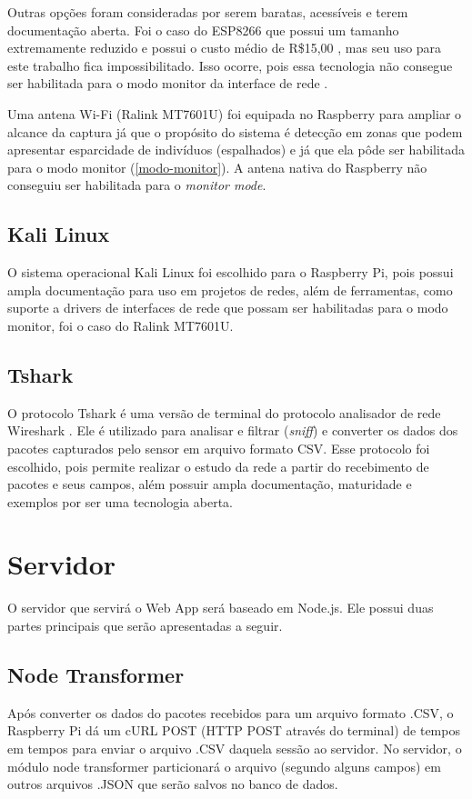 Outras opções foram consideradas por serem baratas, acessíveis e terem documentação aberta. Foi o caso do ESP8266 que possui um tamanho extremamente
reduzido e possui o custo médio de R\$15,00 \cite{Embarcados2015}, mas seu uso para este trabalho fica impossibilitado. Isso
ocorre, pois essa tecnologia não consegue ser habilitada para o modo monitor da interface de rede \cite{Puhl2016} \cite{Ferreira2016}.

Uma antena Wi-Fi (Ralink MT7601U) foi equipada no Raspberry para ampliar o alcance da captura já que o propósito do sistema é detecção em zonas que podem
apresentar esparcidade de indivíduos (espalhados) e já que ela pôde ser habilitada para o modo monitor (\autoref{modo-monitor}). A antena nativa
do Raspberry não conseguiu ser habilitada para o \emph{monitor mode}.

\subsection{Kali Linux}
O sistema operacional Kali Linux \cite{kali} foi escolhido para o Raspberry Pi, pois possui ampla documentação
para uso em projetos de redes, além de ferramentas, como suporte a drivers de interfaces de rede que possam
ser habilitadas para o modo monitor, foi o caso do Ralink MT7601U.

\subsection{Tshark}
O protocolo Tshark é uma versão de terminal do protocolo
analisador de rede Wireshark \cite{Wireshark2017} \cite{Wireshark2017a}. Ele é utilizado para analisar e filtrar (\emph{sniff}) e converter os dados dos pacotes capturados pelo sensor em arquivo formato CSV. Esse protocolo foi escolhido, pois permite realizar o estudo da rede a partir do recebimento de pacotes e seus campos, além possuir ampla documentação, maturidade e exemplos por ser uma tecnologia aberta.

\section{Servidor}
O servidor que servirá o Web App será baseado em Node.js. Ele possui duas partes principais que serão apresentadas a seguir.

\subsection{Node Transformer}
\label{node-transformer}
Após converter os dados do pacotes recebidos para um arquivo formato .CSV, o Raspberry Pi dá um cURL POST (HTTP POST através do terminal) de tempos em tempos para enviar o arquivo .CSV daquela sessão ao servidor. No servidor, o módulo node transformer particionará o arquivo (segundo alguns campos) em outros arquivos .JSON que serão salvos no banco de dados.

